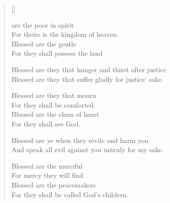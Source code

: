 \newHymn
{}
\settowidth{\versewidth}{Blessed are they that hunger and thirst af}
\begin{verse}[\versewidth]

 are the poor in spirit\\
For theirs is the kingdom of heaven. \\
Blessed are the gentle\\
For they shall possess the land

Blessed are they that hunger and thirst after justice\\
Blessed are they that suffer gladly for justice’ sake.

Blessed are they that mourn \\
For they shall be comforted.\\
Blessed are the clean of heart \\
For they shall see God.

Blessed are ye when they revile and harm you\\
And speak all evil against you untruly for my sake.

Blessed are the merciful\\
For mercy they will find\\
Blessed are the peacemakers\\
For they shall be called God’s children.

\end{verse}


